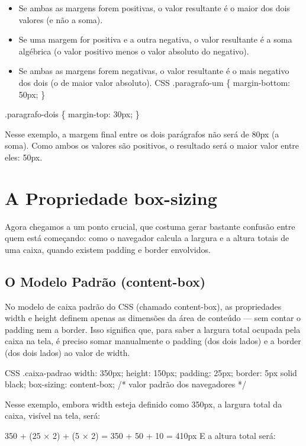 \begin{itemize}
  \item Se ambas as margens forem positivas, o valor resultante é o maior dos dois valores (e não a soma).
  \item Se uma margem for positiva e a outra negativa, o valor resultante é a soma algébrica (o valor positivo menos o valor absoluto do negativo).
  \item Se ambas as margens forem negativas, o valor resultante é o mais negativo dos dois (o de maior valor absoluto). CSS .paragrafo-um \{ margin-bottom: 50px; \}
\end{itemize}

.paragrafo-dois \{ margin-top: 30px; \}

Nesse exemplo, a margem final entre os dois parágrafos não será de 80px (a soma). Como ambos os valores são positivos, o resultado será o maior valor entre eles: 50px.

\section{A Propriedade box-sizing}

Agora chegamos a um ponto crucial, que costuma gerar bastante confusão entre quem está começando: como o navegador calcula a largura e a altura totais de uma caixa, quando existem padding e border envolvidos.

\subsection{O Modelo Padrão (content-box)}

No modelo de caixa padrão do CSS (chamado content-box), as propriedades width e height definem apenas as dimensões da área de conteúdo — sem contar o padding nem a border. Isso significa que, para saber a largura total ocupada pela caixa na tela, é preciso somar manualmente o padding (dos dois lados) e a border (dos dois lados) ao valor de width.

\begin{codebox}{CSS}
.caixa-padrao {
  width: 350px;
  height: 150px;
  padding: 25px;
  border: 5px solid black;
  box-sizing: content-box; /* valor padrão dos navegadores */
}
\end{codebox}

Nesse exemplo, embora width esteja definido como 350px, a largura total da caixa, visível na tela, será:

350 + (25 × 2) + (5 × 2) = 350 + 50 + 10 = 410px E a altura total será:

